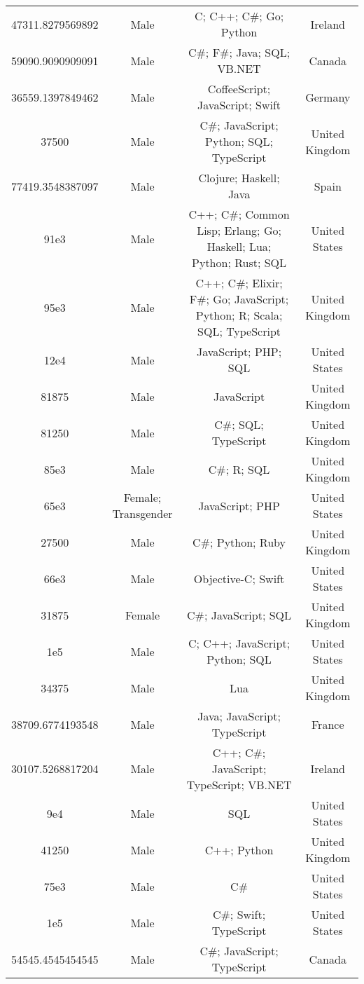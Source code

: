 \begin{center}
\begin{tabular}{ |c|c|c|c| }
47311.8279569892  &  Male  &  C; C++; C\#; Go; Python  &  Ireland  \\ 
59090.9090909091  &  Male  &  C\#; F\#; Java; SQL; VB.NET  &  Canada  \\ 
36559.1397849462  &  Male  &  CoffeeScript; JavaScript; Swift  &  Germany  \\ 
37500  &  Male  &  C\#; JavaScript; Python; SQL; TypeScript  &  United Kingdom  \\ 
77419.3548387097  &  Male  &  Clojure; Haskell; Java  &  Spain  \\ 
91e3  &  Male  &  C++; C\#; Common Lisp; Erlang; Go; Haskell; Lua; Python; Rust; SQL  &  United States  \\ 
95e3  &  Male  &  C++; C\#; Elixir; F\#; Go; JavaScript; Python; R; Scala; SQL; TypeScript  &  United Kingdom  \\ 
12e4  &  Male  &  JavaScript; PHP; SQL  &  United States  \\ 
81875  &  Male  &  JavaScript  &  United Kingdom  \\ 
81250  &  Male  &  C\#; SQL; TypeScript  &  United Kingdom  \\ 
85e3  &  Male  &  C\#; R; SQL  &  United Kingdom  \\ 
65e3  &  Female; Transgender  &  JavaScript; PHP  &  United States  \\ 
27500  &  Male  &  C\#; Python; Ruby  &  United Kingdom  \\ 
66e3  &  Male  &  Objective-C; Swift  &  United States  \\ 
31875  &  Female  &  C\#; JavaScript; SQL  &  United Kingdom  \\ 
1e5  &  Male  &  C; C++; JavaScript; Python; SQL  &  United States  \\ 
34375  &  Male  &  Lua  &  United Kingdom  \\ 
38709.6774193548  &  Male  &  Java; JavaScript; TypeScript  &  France  \\ 
30107.5268817204  &  Male  &  C++; C\#; JavaScript; TypeScript; VB.NET  &  Ireland  \\ 
9e4  &  Male  &  SQL  &  United States  \\ 
41250  &  Male  &  C++; Python  &  United Kingdom  \\ 
75e3  &  Male  &  C\#  &  United States  \\ 
1e5  &  Male  &  C\#; Swift; TypeScript  &  United States  \\ 
54545.4545454545  &  Male  &  C\#; JavaScript; TypeScript  &  Canada  \\ 

\end{tabular}
\end{center}
